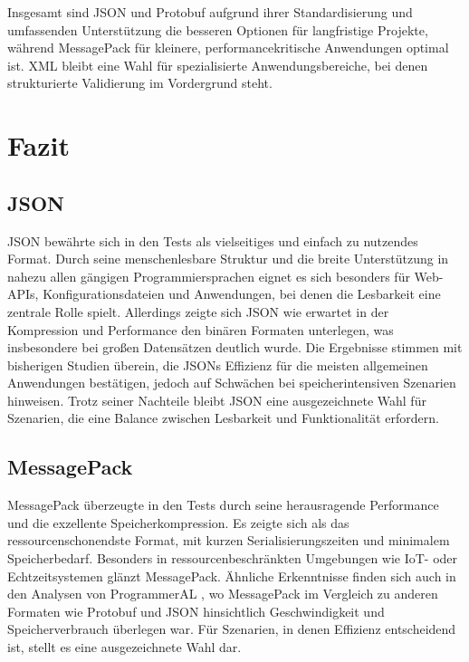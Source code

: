 \documentclass[ngerman]{seminarvorlage}
\begin{document}
Insgesamt sind JSON und Protobuf aufgrund ihrer Standardisierung und umfassenden Unterstützung die besseren Optionen für langfristige Projekte, während MessagePack für kleinere, performancekritische Anwendungen optimal ist. XML bleibt eine Wahl für spezialisierte Anwendungsbereiche, bei denen strukturierte Validierung im Vordergrund steht.


\section{Fazit}

\subsection{JSON}
JSON bewährte sich in den Tests als vielseitiges und einfach zu nutzendes Format. Durch seine menschenlesbare Struktur und die breite Unterstützung in nahezu allen gängigen Programmiersprachen eignet es sich besonders für Web-APIs, Konfigurationsdateien und Anwendungen, bei denen die Lesbarkeit eine zentrale Rolle spielt. Allerdings zeigte sich JSON wie erwartet in der Kompression und Performance den binären Formaten unterlegen, was insbesondere bei großen Datensätzen deutlich wurde. Die Ergebnisse stimmen mit bisherigen Studien überein, die JSONs Effizienz für die meisten allgemeinen Anwendungen bestätigen, jedoch auf Schwächen bei speicherintensiven Szenarien hinweisen. Trotz seiner Nachteile bleibt JSON eine ausgezeichnete Wahl für Szenarien, die eine Balance zwischen Lesbarkeit und Funktionalität erfordern.

\subsection{MessagePack}
MessagePack überzeugte in den Tests durch seine herausragende Performance und die exzellente Speicherkompression. Es zeigte sich als das ressourcenschonendste Format, mit kurzen Serialisierungszeiten und minimalem Speicherbedarf. Besonders in ressourcenbeschränkten Umgebungen wie IoT- oder Echtzeitsystemen glänzt MessagePack. Ähnliche Erkenntnisse finden sich auch in den Analysen von ProgrammerAL \cite{ProgrammerAL_SerializationBenchmarks}, wo MessagePack im Vergleich zu anderen Formaten wie Protobuf und JSON hinsichtlich Geschwindigkeit und Speicherverbrauch überlegen war. Für Szenarien, in denen Effizienz entscheidend ist, stellt es eine ausgezeichnete Wahl dar.
\end{document}
